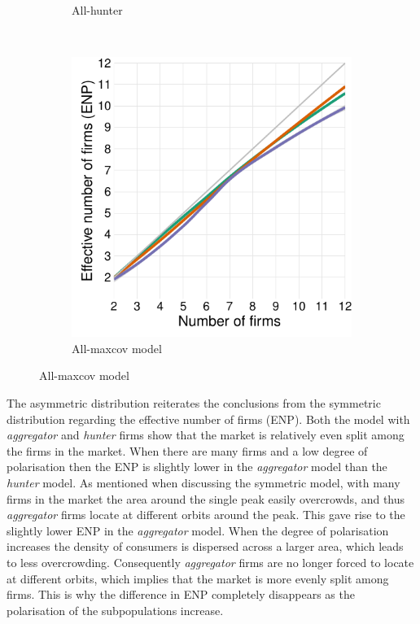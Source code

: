 \documentclass[preprint, 12pt]{elsarticle}
\begin{document}
\begin{figure}[ht!]
\begin{subfigure}[t]{0.315\textwidth}
		\caption{All-hunter}
		\label{fig:enp_hunter}
	\end{subfigure}
	~
	\begin{subfigure}[t]{0.315\textwidth}
		\centering
		\includegraphics[width=\textwidth, trim={8mm 0 0 0}]{Graphics/fig342a_tall.pdf}
		\caption{All-maxcov model}
		\label{fig:enp_maxcov}
	\end{subfigure}
	
	\label{fig:asymetric_enp}
\end{figure}

The asymmetric distribution reiterates the conclusions from the symmetric distribution regarding the effective number of firms (ENP). Both the model with \emph{aggregator} and \emph{hunter} firms show that the market is relatively even split among the firms in the market. When there are many firms and a low degree of polarisation then the ENP is slightly lower in the \emph{aggregator} model than the \emph{hunter} model. As mentioned when discussing the symmetric model, with many firms in the market the area around the single peak easily overcrowds, and thus \emph{aggregator} firms locate at different orbits around the peak. This gave rise to the slightly lower ENP in the \emph{aggregator} model. When the degree of polarisation increases the density of consumers is dispersed across a larger area, which leads to less overcrowding. Consequently \emph{aggregator} firms are no longer forced to locate at different orbits, which implies that the market is more evenly split among firms. This is why the difference in ENP completely disappears as the polarisation of the subpopulations increase.
\end{document}
